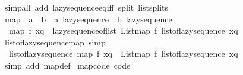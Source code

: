 \begin{isabellebody}
\ {\isacharparenleft}{\kern0pt}simp{\isacharunderscore}{\kern0pt}all\ add{\isacharcolon}{\kern0pt}\ lazy{\isacharunderscore}{\kern0pt}sequence{\isacharunderscore}{\kern0pt}eq{\isacharunderscore}{\kern0pt}iff\ split{\isacharcolon}{\kern0pt}\ list{\isachardot}{\kern0pt}splits{\isacharparenright}{\kern0pt}%
\endisatagproof
{\isafoldproof}%
%
\isadelimproof
\isanewline
%
\endisadelimproof
\isanewline
{}\isamarkupfalse%
\ map\ {\isacharcolon}{\kern0pt}{\isacharcolon}{\kern0pt}\ {\isachardoublequoteopen}{\isacharparenleft}{\kern0pt}{\isacharprime}{\kern0pt}a\ {\isasymRightarrow}\ {\isacharprime}{\kern0pt}b{\isacharparenright}{\kern0pt}\ {\isasymRightarrow}\ {\isacharprime}{\kern0pt}a\ lazy{\isacharunderscore}{\kern0pt}sequence\ {\isasymRightarrow}\ {\isacharprime}{\kern0pt}b\ lazy{\isacharunderscore}{\kern0pt}sequence{\isachardoublequoteclose}\isanewline
{}\isanewline
\ \ {\isachardoublequoteopen}map\ f\ xq\ {\isacharequal}{\kern0pt}\ lazy{\isacharunderscore}{\kern0pt}sequence{\isacharunderscore}{\kern0pt}of{\isacharunderscore}{\kern0pt}list\ {\isacharparenleft}{\kern0pt}List{\isachardot}{\kern0pt}map\ f\ {\isacharparenleft}{\kern0pt}list{\isacharunderscore}{\kern0pt}of{\isacharunderscore}{\kern0pt}lazy{\isacharunderscore}{\kern0pt}sequence\ xq{\isacharparenright}{\kern0pt}{\isacharparenright}{\kern0pt}{\isachardoublequoteclose}\isanewline
\isanewline
{}\isamarkupfalse%
\ list{\isacharunderscore}{\kern0pt}of{\isacharunderscore}{\kern0pt}lazy{\isacharunderscore}{\kern0pt}sequence{\isacharunderscore}{\kern0pt}map\ {\isacharbrackleft}{\kern0pt}simp{\isacharbrackright}{\kern0pt}{\isacharcolon}{\kern0pt}\isanewline
\ \ {\isachardoublequoteopen}list{\isacharunderscore}{\kern0pt}of{\isacharunderscore}{\kern0pt}lazy{\isacharunderscore}{\kern0pt}sequence\ {\isacharparenleft}{\kern0pt}map\ f\ xq{\isacharparenright}{\kern0pt}\ {\isacharequal}{\kern0pt}\ List{\isachardot}{\kern0pt}map\ f\ {\isacharparenleft}{\kern0pt}list{\isacharunderscore}{\kern0pt}of{\isacharunderscore}{\kern0pt}lazy{\isacharunderscore}{\kern0pt}sequence\ xq{\isacharparenright}{\kern0pt}{\isachardoublequoteclose}\isanewline
%
\isadelimproof
\ \ %
\endisadelimproof
%
\isatagproof
{}\isamarkupfalse%
\ {\isacharparenleft}{\kern0pt}simp\ add{\isacharcolon}{\kern0pt}\ map{\isacharunderscore}{\kern0pt}def{\isacharparenright}{\kern0pt}%
\endisatagproof
{\isafoldproof}%
%
\isadelimproof
\isanewline
%
\endisadelimproof
\isanewline
{}\isamarkupfalse%
\ map{\isacharunderscore}{\kern0pt}code\ {\isacharbrackleft}{\kern0pt}code{\isacharbrackright}{\kern0pt}{\isacharcolon}{\kern0pt}\isanewline

\end{isabellebody}
